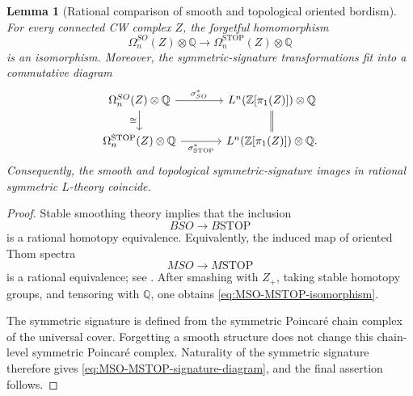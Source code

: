 \documentclass[10pt,reqno]{amsart}
\numberwithin{equation}{section}
\newtheorem{lemma}{Lemma}
\theoremstyle{definition}
\theoremstyle{remark}
\newcommand{\Z}{\mathbb Z}
\newcommand{\Q}{\mathbb Q}
\newcommand{\STOP}{\mathrm{STOP}}
\begin{document}
\begin{lemma}[Rational comparison of smooth and topological oriented bordism]
\label{lem:MSO-MSTOP-comparison}
For every connected CW complex \(Z\), the forgetful homomorphism
\begin{equation}\label{eq:MSO-MSTOP-isomorphism}
\Omega_n^{SO}(Z)\otimes\Q
\longrightarrow
\Omega_n^{\STOP}(Z)\otimes\Q
\end{equation}
is an isomorphism.  Moreover, the symmetric-signature transformations
fit into a commutative diagram
\begin{equation}\label{eq:MSO-MSTOP-signature-diagram}
\begin{tikzcd}[column sep=large]
\Omega_n^{SO}(Z)\otimes\Q
  \arrow[r,"\sigma^*_{SO}"]
  \arrow[d,"\cong"']
& L^n(\Z[\pi_1(Z)])\otimes\Q
  \arrow[d,equal] \\
\Omega_n^{\STOP}(Z)\otimes\Q
  \arrow[r,"\sigma^*_{\STOP}"']
& L^n(\Z[\pi_1(Z)])\otimes\Q.
\end{tikzcd}
\end{equation}
Consequently, the smooth and topological symmetric-signature images
in rational symmetric \(L\)-theory coincide.
\end{lemma}

\begin{proof}
Stable smoothing theory implies that the inclusion
\[
BSO\longrightarrow B\STOP
\]
is a rational homotopy equivalence.  Equivalently, the induced map of
oriented Thom spectra
\[
MSO\longrightarrow M\STOP
\]
is a rational equivalence; see
\cite{KirbySiebenmann,MadsenMilgram}.  After smashing with
\(Z_+\), taking stable homotopy groups, and tensoring with \(\Q\), one
obtains \eqref{eq:MSO-MSTOP-isomorphism}.

The symmetric signature is defined from the symmetric Poincar\'e chain
complex of the universal cover.  Forgetting a smooth structure does
not change this chain-level symmetric Poincar\'e complex.  Naturality
of the symmetric signature therefore gives
\eqref{eq:MSO-MSTOP-signature-diagram}, and the final assertion
follows.
\end{proof}
\end{document}
